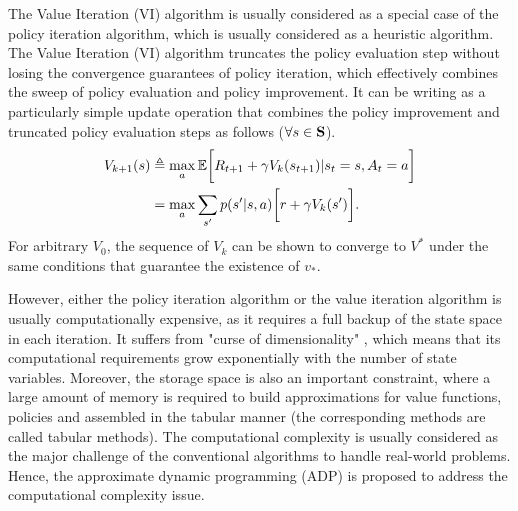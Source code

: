The Value Iteration (VI) algorithm is usually considered as a special case of the policy iteration algorithm, which is usually considered as a heuristic algorithm.
The Value Iteration (VI) algorithm truncates the policy evaluation step without losing the convergence guarantees of policy iteration, which effectively combines the sweep of policy evaluation and policy improvement.
It can be writing as a particularly simple update operation that combines the policy improvement and truncated policy evaluation steps as follows ($\forall s\in\mathbf{S}$).
\begin{align*}
    V_{k+1}(s)
    &\triangleq \max_{a} \mathbb{E}\bigg[
        R_{t+1} + \gamma V_{k}(s_{t+1}) | s_t=s, A_t=a
    \bigg]
    \nonumber\\
    &= \max_{a} \sum_{s'} p(s'| s, a) \bigg[
        r + \gamma V_{k}(s')
    \bigg].
\end{align*}
For arbitrary $V_0$, the sequence of $V_k$ can be shown to converge to $V^*$ under the same conditions that guarantee the existence of $v_*$.

However, either the policy iteration algorithm or the value iteration algorithm is usually computationally expensive, as it requires a full backup of the state space in each iteration.
It suffers from "curse of dimensionality" , which means that its computational requirements grow exponentially with the number of state variables.
Moreover, the storage space is also an important constraint, where a large amount of memory is required to build approximations for value functions, policies and assembled in the tabular manner (the corresponding methods are called tabular methods).
The computational complexity is usually considered as the major challenge of the conventional algorithms to handle real-world problems.
Hence, the approximate dynamic programming (ADP) is proposed to address the computational complexity issue.

